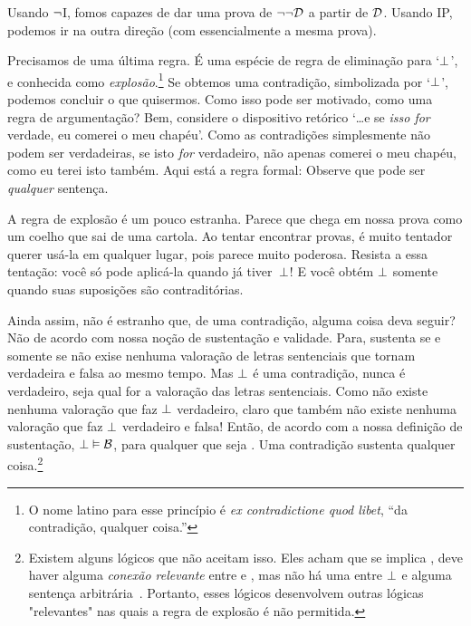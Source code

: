 Usando $\neg$I, fomos capazes de dar uma prova de $\neg\neg\mathcal{D}$ a partir de $\mathcal{D}$. Usando IP, podemos ir na outra dire\c c\~ao (com essencialmente a mesma prova).
	\begin{fitchproof}
		\open
		\close
	\end{fitchproof}

Precisamos de uma \'ultima regra. \'E uma esp\'ecie de regra de elimina\c c\~ao para `$\bot$', e conhecida como \emph{explos\~ao}.\footnote{O nome latino para esse princ\'ipio \'e  \emph{ex contradictione quod libet}, ``da contradi\c c\~ao, qualquer coisa.''}  Se obtemos uma contradi\c c\~ao, simbolizada por `$\bot$', podemos concluir o que quisermos.  Como isso pode ser motivado, como uma regra de argumenta\c c\~ao? Bem, considere o dispositivo ret\'orico `\ldots e se \emph{isso for} verdade, eu comerei o meu chap\'eu'. Como as contradi\c c\~oes simplesmente n\~ao podem ser verdadeiras, se isto \emph{for} verdadeiro, n\~ao apenas comerei o meu chap\'eu, como eu terei isto tamb\'em. Aqui est\'a a regra formal:
Observe que   pode ser \emph{qualquer} senten\c ca.

A regra de explos\~ao \'e um pouco estranha. Parece que    chega em nossa prova como um coelho que sai de uma cartola. Ao tentar encontrar provas, \'e muito tentador querer us\'a-la em qualquer lugar, pois parece muito poderosa. Resista a essa tenta\c c\~ao: voc\^e s\'o pode aplic\'a-la quando j\'a tiver~$\bot$!   E voc\^e obt\'em $\bot$   somente quando suas suposi\c c\~oes s\~ao contradit\'orias.
 

Ainda assim, n\~ao \'e estranho que, de uma contradi\c c\~ao, alguma coisa deva seguir? N\~ao de acordo com nossa no\c c\~ao de sustenta\c c\~ao e validade. Para,  sustenta  se e somente se  n\~ao exise nenhuma valora\c c\~ao de letras sentenciais que  tornam  verdadeira e  falsa ao mesmo tempo. Mas $\bot$  \'e uma contradi\c c\~ao, nunca \'e verdadeiro, seja qual for a valora\c c\~ao das letras sentenciais.  Como n\~ao existe nenhuma valora\c c\~ao que faz $\bot$ verdadeiro, claro que tamb\'em n\~ao existe nenhuma valora\c c\~ao que faz  $\bot$  verdadeiro e  falsa! Ent\~ao, de acordo com a nossa defini\c c\~ao de sustenta\c c\~ao,  $\bot \vDash \mathcal{B}$,  para qualquer que seja . Uma contradi\c c\~ao sustenta qualquer coisa.\footnote{Existem alguns l\'ogicos que n\~ao aceitam isso. Eles acham que se  implica , deve haver alguma \emph{conex\~ao relevante} entre  e , mas n\~ao h\'a uma entre $\bot$ e alguma senten\c ca arbitr\'aria~. Portanto, esses l\'ogicos desenvolvem outras l\'ogicas "relevantes" nas quais  a regra de explos\~ao \'e n\~ao permitida.}


